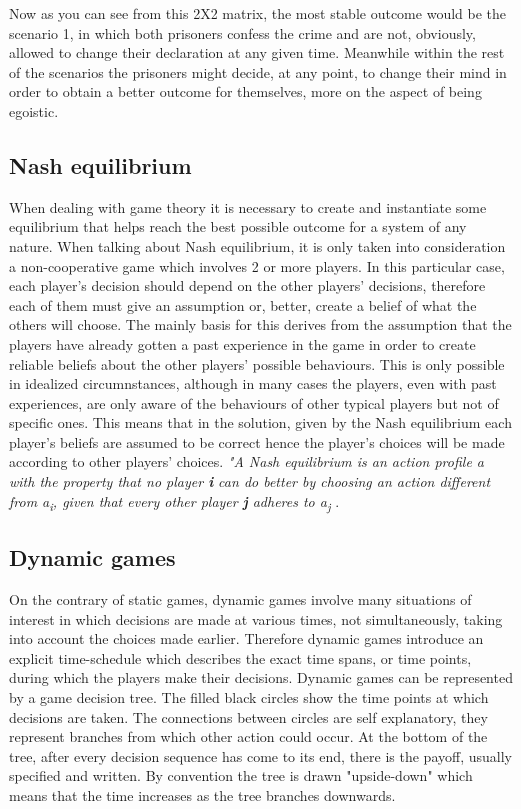 \documentclass[conference]{IEEEtran}
\begin{document}
Now as you can see from this 2X2 matrix, the most stable outcome would be the scenario 1, in which both prisoners confess the crime and are not, obviously, allowed to change their declaration at any given time. Meanwhile within the rest of the scenarios the prisoners might decide, at any point, to change their mind in order to obtain a better outcome for themselves, more on the aspect of being egoistic\cite{b5}.


\subsection{Nash equilibrium}
When dealing with game theory it is necessary to create and instantiate some equilibrium that helps reach the best possible outcome for a system of any nature. When talking about Nash equilibrium, it is only taken into consideration a non-cooperative game which involves 2 or more players. In this particular case, each player's decision should depend on the other players' decisions, therefore each of them must give an assumption or, better, create a belief of what the others will choose. The mainly basis for this derives from the assumption that the players have already gotten a past experience in the game in order to create reliable beliefs about the other players' possible behaviours.
This is only possible in idealized circumnstances, although in many cases the players, even with past experiences, are only aware of the behaviours of other typical players but not of specific ones. This means that in the solution, given by the Nash equilibrium each player's beliefs are assumed to be correct hence the player's choices will be made according to other players' choices. 
\textit{"A Nash equilibrium is an action profile a\textsuperscript{\text{*}} with the property that no player \textbf{i} can do better by choosing an action different from a\textsuperscript{\text{*}}\textsubscript{i}, given that every other player \textbf{j} adheres to a\textsuperscript{\text{*}}\textsubscript{j} }\cite{b6}.


\subsection{Dynamic games}
On the contrary of static games, dynamic games involve many situations of interest in which decisions are
made at various times, not simultaneously, taking into account the choices made earlier. Therefore dynamic games introduce an explicit time-schedule which describes the exact time spans, or time points, during which the players make their decisions.
Dynamic games can be represented by a game decision tree. The filled black circles show the time points at which decisions are taken. The connections between circles are self explanatory, they represent branches from which other action could occur. At the bottom of the tree, after every decision sequence has come to its end, there is the payoff, usually specified and written. By convention the tree is drawn "upside-down" which means that the time increases as the tree branches downwards.
\end{document}
